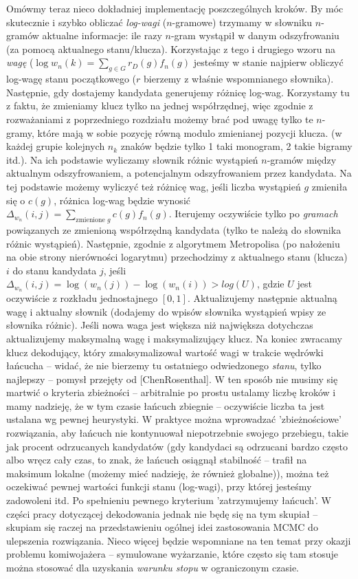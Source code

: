 \documentclass[a4paper]{article}
\begin{document}
Omówmy teraz nieco dokładniej implementację poszczególnych kroków. By móc skutecznie i szybko obliczać \textit{log-wagi} ($n$-gramowe) trzymamy w słowniku $n$-gramów aktualne informacje: ile razy $n$-gram wystąpił w danym odszyfrowaniu (za pomocą aktualnego stanu/klucza). Korzystając z tego i drugiego wzoru na \textit{wagę} ($\log w_n(k) =\sum\limits_{g \in G}  {r_D(g)} f_n(g)$ jesteśmy w stanie najpierw obliczyć log-wagę stanu początkowego ($r$ bierzemy z właśnie wspomnianego słownika). Następnie, gdy dostajemy kandydata generujemy różnicę log-wag. Korzystamy tu z faktu, że zmieniamy klucz tylko na jednej współrzędnej, więc zgodnie z rozważaniami z poprzedniego rozdziału możemy brać pod uwagę tylko te $n$-gramy, które mają w sobie pozycję równą modulo zmienianej pozycji klucza. (w każdej grupie kolejnych $n_k$ znaków będzie tylko 1 taki monogram, 2 takie bigramy itd.). Na ich podstawie wyliczamy słownik różnic wystąpień $n$-gramów między aktualnym odszyfrowaniem, a potencjalnym odszyfrowaniem przez kandydata. Na tej podstawie możemy wyliczyć też różnicę wag, jeśli liczba wystąpień $g$ zmieniła się o $c(g)$, różnica log-wag będzie wynosić $\Delta_{w_n}(i,j) = \sum\limits_{\text{zmienione } g}  {c(g)} f_n(g)$. Iterujemy oczywiście tylko po \textit{gramach} powiązanych ze zmienioną współrzędną kandydata (tylko te należą do słownika różnic wystąpień). Następnie, zgodnie z algorytmem Metropolisa (po nałożeniu na obie strony nierówności logarytmu) przechodzimy z aktualnego stanu (klucza) $i$ do stanu kandydata $j$, jeśli $\Delta_{w_n}(i,j) =\log(w_n(j)) - \log(w_n(i)) > log(U)$, gdzie $U$ jest oczywiście z rozkładu jednostajnego $[0,1]$. Aktualizujemy następnie aktualną wagę i aktualny słownik (dodajemy do wpisów słownika wystąpień wpisy ze słownika różnic). Jeśli nowa waga jest większa niż największa dotychczas aktualizujemy maksymalną wagę i maksymalizujący klucz. Na koniec zwracamy klucz dekodujący, który zmaksymalizował wartość wagi w trakcie wędrówki łańcucha – widać, że nie bierzemy tu ostatniego odwiedzonego \textit{stanu}, tylko najlepszy – pomysł przejęty od [ChenRosenthal]. W ten sposób nie musimy się martwić o kryteria zbieżności – arbitralnie po prostu ustalamy liczbę kroków i mamy nadzieję, że w tym czasie łańcuch zbiegnie – oczywiście liczba ta jest ustalana wg pewnej heurystyki. W praktyce można wprowadzać 'zbieżnościowe' rozwiązania, aby łańcuch nie kontynuował niepotrzebnie swojego przebiegu, takie jak procent odrzucanych kandydatów (gdy kandydaci są odrzucani bardzo często albo wręcz cały czas, to znak, że łańcuch osiągnął stabilność – trafił na maksimum lokalne (możemy mieć nadzieję, że również globalne)), można też oczekiwać pewnej wartości funkcji stanu (log-wagi), przy której jesteśmy zadowoleni itd. Po spełnieniu pewnego kryterium 'zatrzymujemy łańcuch'. W części pracy dotyczącej dekodowania jednak nie będę się na tym skupiał – skupiam się raczej na przedstawieniu ogólnej idei zastosowania MCMC do ulepszenia rozwiązania. Nieco więcej będzie wspomniane na ten temat przy okazji problemu komiwojażera – symulowane wyżarzanie, które często się tam stosuje można stosować dla uzyskania \textit{warunku stopu} w ograniczonym czasie.
\end{document}
